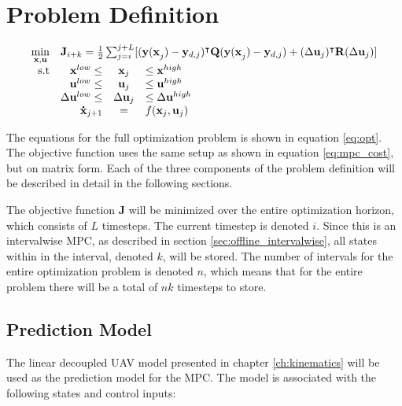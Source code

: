 \section{Problem Definition}

\begin{equation}
\label{eq:opt}
	\begin{array}{rrclcl}
		\displaystyle \min_{\mathbf{x}, \mathbf{u}} & \multicolumn{3}{l}{\mathbf{J}_{i+k} = \frac{1}{2} \sum_{j=i}^{j+L} [(\mathbf{y(\mathbf{x}}_j)-\mathbf{y}_{d,j})^\intercal \mathbf{Q}(\mathbf{y(\mathbf{x}}_j)-\mathbf{y}_{d,j}) + (\Delta\mathbf{u}_j)^\intercal \mathbf{R}(\Delta\mathbf{u}_j)]}\\
		\textrm{s.t}
		& \mathbf{x}^{low} \leq & \mathbf{x}_j & \leq \mathbf{x}^{high} \\
		& \mathbf{u}^{low} \leq & \mathbf{u}_j & \leq \mathbf{u}^{high} \\
		& \Delta\mathbf{u}^{low} \leq & \Delta\mathbf{u}_j & \leq \Delta\mathbf{u}^{high} \\
		&  \mathbf{\dot{x}}_{j+1} &= & f(\mathbf{x}_j,\mathbf{u}_j) 
	\end{array}
\end{equation}

The equations for the full optimization problem is shown in equation \ref{eq:opt}. The objective function uses the same setup as shown in equation \ref{eq:mpc_cost}, but on matrix form. Each of the three components of the problem definition will be described in detail in the following sections.

The objective function $\mathbf{J}$ will be minimized over the entire optimization horizon, which consists of $L$ timesteps. The current timestep is denoted $i$. Since this is an intervalwise MPC, as described in section \ref{sec:offline_intervalwise}, all states within in the interval, denoted $k$, will be stored. The number of intervals for the entire optimization problem is denoted $n$, which means that for the entire problem there will be a total of $nk$ timesteps to store. 


\subsection{Prediction Model}

The linear decoupled UAV model presented in chapter \ref{ch:kinematics} will be used as the prediction model for the MPC. The model is associated with the following states and control inputs:

